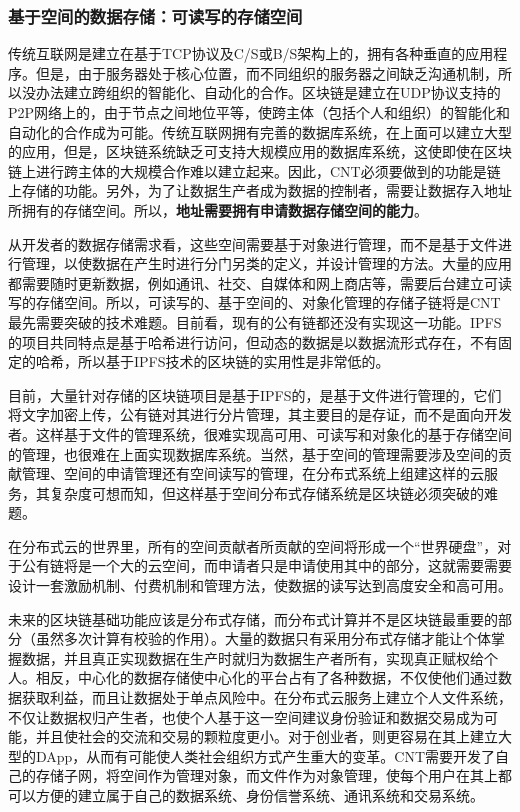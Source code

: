 \documentclass[a4paper,12pt]{article}
\begin{document}
\subsubsection{基于空间的数据存储：可读写的存储空间}

传统互联网是建立在基于TCP协议及C/S或B/S架构上的，拥有各种垂直的应用程序。但是，由于服务器处于核心位置，而不同组织的服务器之间缺乏沟通机制，所以没办法建立跨组织的智能化、自动化的合作。区块链是建立在UDP协议支持的P2P网络上的，由于节点之间地位平等，使跨主体（包括个人和组织）的智能化和自动化的合作成为可能。传统互联网拥有完善的数据库系统，在上面可以建立大型的应用，但是，区块链系统缺乏可支持大规模应用的数据库系统，这使即使在区块链上进行跨主体的大规模合作难以建立起来。因此，CNT必须要做到的功能是链上存储的功能。另外，为了让数据生产者成为数据的控制者，需要让数据存入地址所拥有的存储空间。所以，\textbf{地址需要拥有申请数据存储空间的能力}。

从开发者的数据存储需求看，这些空间需要基于对象进行管理，而不是基于文件进行管理，以使数据在产生时进行分门另类的定义，并设计管理的方法。大量的应用都需要随时更新数据，例如通讯、社交、自媒体和网上商店等，需要后台建立可读写的存储空间。所以，可读写的、基于空间的、对象化管理的存储子链将是CNT最先需要突破的技术难题。目前看，现有的公有链都还没有实现这一功能。IPFS的项目共同特点是基于哈希进行访问，但动态的数据是以数据流形式存在，不有固定的哈希，所以基于IPFS技术的区块链的实用性是非常低的。

目前，大量针对存储的区块链项目是基于IPFS的，是基于文件进行管理的，它们将文字加密上传，公有链对其进行分片管理，其主要目的是存证，而不是面向开发者。这样基于文件的管理系统，很难实现高可用、可读写和对象化的基于存储空间的管理，也很难在上面实现数据库系统。当然，基于空间的管理需要涉及空间的贡献管理、空间的申请管理还有空间读写的管理，在分布式系统上组建这样的云服务，其复杂度可想而知，但这样基于空间分布式存储系统是区块链必须突破的难题。

在分布式云的世界里，所有的空间贡献者所贡献的空间将形成一个“世界硬盘”，对于公有链将是一个大的云空间，而申请者只是申请使用其中的部分，这就需要需要设计一套激励机制、付费机制和管理方法，使数据的读写达到高度安全和高可用。

未来的区块链基础功能应该是分布式存储，而分布式计算并不是区块链最重要的部分（虽然多次计算有校验的作用）。大量的数据只有采用分布式存储才能让个体掌握数据，并且真正实现数据在生产时就归为数据生产者所有，实现真正赋权给个人。相反，中心化的数据存储使中心化的平台占有了各种数据，不仅使他们通过数据获取利益，而且让数据处于单点风险中。在分布式云服务上建立个人文件系统，不仅让数据权归产生者，也使个人基于这一空间建议身份验证和数据交易成为可能，并且使社会的交流和交易的颗粒度更小。对于创业者，则更容易在其上建立大型的DApp，从而有可能使人类社会组织方式产生重大的变革。CNT需要开发了自己的存储子网，将空间作为管理对象，而文件作为对象管理，使每个用户在其上都可以方便的建立属于自己的数据系统、身份信誉系统、通讯系统和交易系统。
\end{document}
